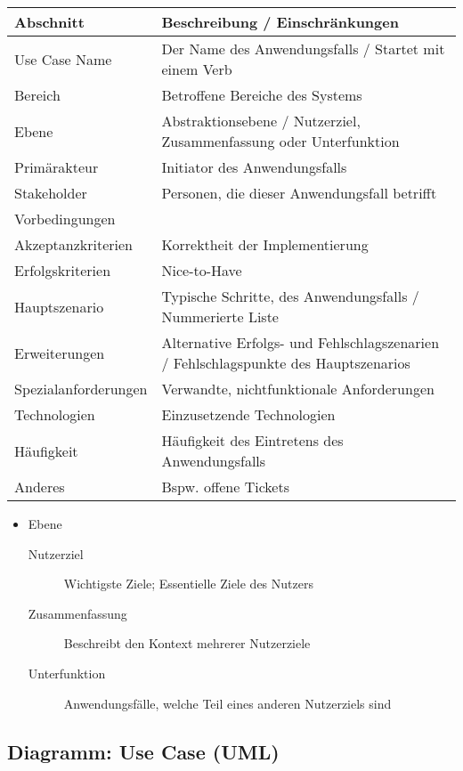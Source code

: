 			\begin{table}[ht]
				\begin{tabular}{l l}
					Abschnitt & Beschreibung / Einschränkungen \\
					\hline
					Use Case Name & Der Name des Anwendungsfalls / Startet mit einem Verb \\
					Bereich & Betroffene Bereiche des Systems \\
					Ebene & Abstraktionsebene / Nutzerziel, Zusammenfassung oder Unterfunktion \\
					Primärakteur & Initiator des Anwendungsfalls \\
					Stakeholder & Personen, die dieser Anwendungsfall betrifft \\
					Vorbedingungen & \\
					Akzeptanzkriterien & Korrektheit der Implementierung \\
					Erfolgskriterien & Nice-to-Have \\
					Hauptszenario & Typische Schritte, des Anwendungsfalls / Nummerierte Liste \\
					Erweiterungen & Alternative Erfolgs- und Fehlschlagszenarien / Fehlschlagspunkte des Hauptszenarios \\
					Spezialanforderungen & Verwandte, nichtfunktionale Anforderungen \\
					Technologien & Einzusetzende Technologien \\
					Häufigkeit & Häufigkeit des Eintretens des Anwendungsfalls \\
					Anderes & Bspw. offene Tickets \\
				\end{tabular}
				
				\begin{itemize}
					\item Ebene
						\begin{description}
							\item[Nutzerziel] Wichtigste Ziele; Essentielle Ziele des Nutzers
							\item[Zusammenfassung] Beschreibt den Kontext mehrerer Nutzerziele
							\item[Unterfunktion] Anwendungsfälle, welche Teil eines anderen Nutzerziels sind
						\end{description}
				\end{itemize}
			\end{table}
		
		\subsection{Diagramm: Use Case (UML)}
			\label{diagram:umlusecase}
			
